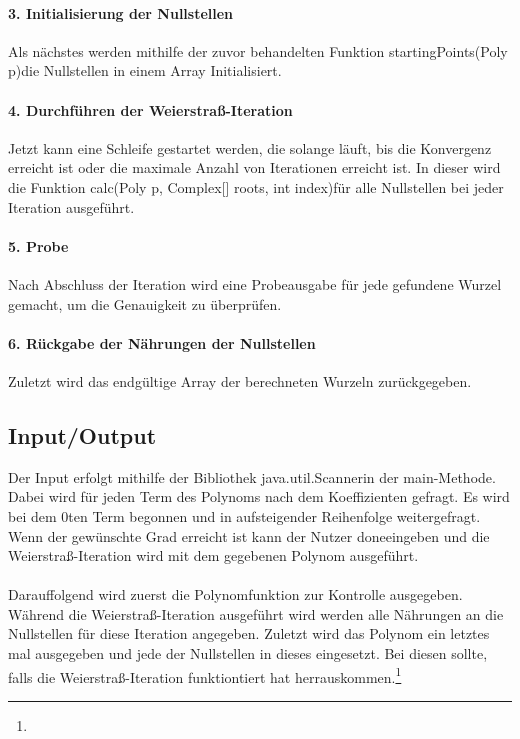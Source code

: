 \documentclass[12pt]{article}
\begin{document}
\paragraph{3. Initialisierung der Nullstellen}
Als nächstes werden mithilfe der zuvor behandelten Funktion \glqq startingPoints(Poly p)\grqq\space die Nullstellen in einem Array Initialisiert.

\paragraph{4. Durchführen der Weierstraß-Iteration}
Jetzt kann eine Schleife gestartet werden, die solange läuft, bis die Konvergenz erreicht ist oder die maximale Anzahl von Iterationen erreicht ist. In dieser wird die Funktion \glqq calc(Poly p, Complex[] roots, int index)\grqq\space für alle Nullstellen bei jeder Iteration ausgeführt.

\paragraph{5. Probe}
Nach Abschluss der Iteration wird eine Probeausgabe für jede gefundene Wurzel gemacht, um die Genauigkeit zu überprüfen.

\paragraph{6. Rückgabe der Nährungen der Nullstellen}
Zuletzt wird das endgültige Array der berechneten Wurzeln zurückgegeben.

\subsection{Input/Output}
Der Input erfolgt mithilfe der Bibliothek \glqq java.util.Scanner\grqq\space in der \glqq main\grqq-Methode. Dabei wird für jeden Term des Polynoms nach dem Koeffizienten gefragt. Es wird bei dem $0$ten Term begonnen und in aufsteigender Reihenfolge weitergefragt. Wenn der gewünschte Grad erreicht ist kann der Nutzer \glqq done\grqq\space eingeben und die Weierstraß-Iteration wird mit dem gegebenen Polynom ausgeführt.\\
\\
Darauffolgend wird zuerst die Polynomfunktion zur Kontrolle ausgegeben. Während die Weierstraß-Iteration ausgeführt wird werden alle Nährungen an die Nullstellen für diese Iteration angegeben. Zuletzt wird das Polynom ein letztes mal ausgegeben und jede der Nullstellen in dieses eingesetzt. Bei diesen sollte, falls die Weierstraß-Iteration funktiontiert hat \grqq\space herrauskommen.\footnote{
}
\end{document}
